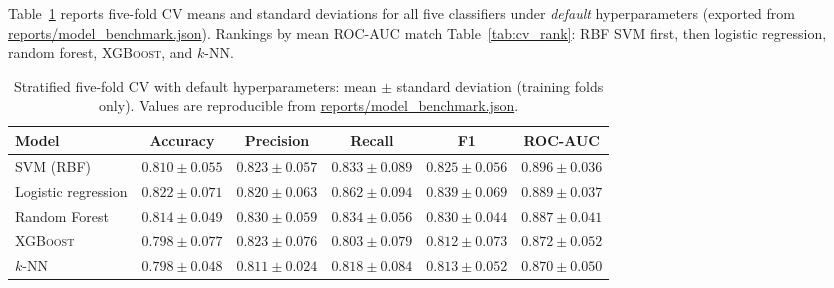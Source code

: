 \documentclass[11pt,a4paper]{article}
\begin{document}
Table~\ref{tab:benchmark_full} reports five-fold CV means and standard deviations for all five classifiers under \emph{default} hyperparameters (exported from \url{reports/model_benchmark.json}). Rankings by mean ROC-AUC match Table~\ref{tab:cv_rank}: RBF SVM first, then logistic regression, random forest, \textsc{XGBoost}, and $k$-NN.

\begin{table}[htbp]
  \centering
  \caption{Stratified five-fold CV with default hyperparameters: mean $\pm$ standard deviation (training folds only). Values are reproducible from \url{reports/model_benchmark.json}.}
  \label{tab:benchmark_full}
  {\footnotesize
  \begin{tabular}{@{}lccccc@{}}
    \toprule
    Model & Accuracy & Precision & Recall & F1 & ROC-AUC \\
    \midrule
    SVM (RBF)           & $\num{0.810} \pm \num{0.055}$ & $\num{0.823} \pm \num{0.057}$ & $\num{0.833} \pm \num{0.089}$ & $\num{0.825} \pm \num{0.056}$ & $\num{0.896} \pm \num{0.036}$ \\
    Logistic regression & $\num{0.822} \pm \num{0.071}$ & $\num{0.820} \pm \num{0.063}$ & $\num{0.862} \pm \num{0.094}$ & $\num{0.839} \pm \num{0.069}$ & $\num{0.889} \pm \num{0.037}$ \\
    Random Forest       & $\num{0.814} \pm \num{0.049}$ & $\num{0.830} \pm \num{0.059}$ & $\num{0.834} \pm \num{0.056}$ & $\num{0.830} \pm \num{0.044}$ & $\num{0.887} \pm \num{0.041}$ \\
    \textsc{XGBoost}     & $\num{0.798} \pm \num{0.077}$ & $\num{0.823} \pm \num{0.076}$ & $\num{0.803} \pm \num{0.079}$ & $\num{0.812} \pm \num{0.073}$ & $\num{0.872} \pm \num{0.052}$ \\
    $k$-NN              & $\num{0.798} \pm \num{0.048}$ & $\num{0.811} \pm \num{0.024}$ & $\num{0.818} \pm \num{0.084}$ & $\num{0.813} \pm \num{0.052}$ & $\num{0.870} \pm \num{0.050}$ \\
    \bottomrule
  \end{tabular}
  }
\end{table}
\end{document}
